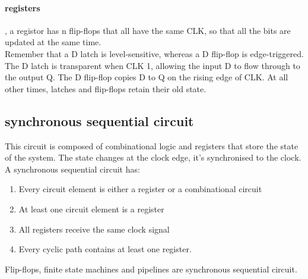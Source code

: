 	\paragraph{registers}, a registor has n flip-flops that all have the same CLK, so that all the bits are updated at the same time.
	\\Remember that a D latch is level-sensitive, whereas a D flip-flop is edge-triggered. The D latch is transparent when CLK   1, allowing the input D to flow through to the output Q. The D flip-flop copies D to Q on the rising edge of CLK. At all other times, latches and flip-flops retain their old state.
	\subsection{synchronous sequential circuit}
	This circuit is composed of combinational logic and registers that store the state of the system. The state changes at the clock edge, it's synchronised to the clock.\\
	A synchronous sequential circuit has:
	\begin{enumerate}
		\item Every circuit element is either a register or a combinational circuit
		\item At least one circuit element is a register
		\item All registers receive the same clock signal
		\item Every cyclic path contains at least one register.
	\end{enumerate}
	Flip-flops, finite state machines and pipelines are synchronous sequential circuit.
